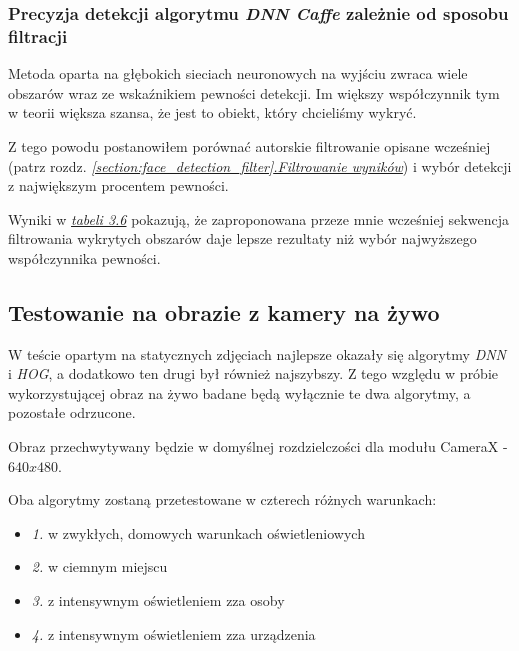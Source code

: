 \subsubsection{Precyzja detekcji algorytmu \textit{DNN Caffe} zależnie od sposobu filtracji}

Metoda oparta na głębokich sieciach neuronowych na wyjściu zwraca wiele obszarów wraz ze wskaźnikiem pewności detekcji. Im większy współczynnik tym w teorii większa szansa, że jest to obiekt, który chcieliśmy wykryć.
\par
Z tego powodu postanowiłem porównać autorskie filtrowanie opisane wcześniej (patrz rozdz. \hyperref[{section:face_detection_filter}]{\textit{\ref{section:face_detection_filter}.Filtrowanie wyników}}) i wybór detekcji z największym procentem pewności.
\par

\vspace{8mm}



Wyniki w \hyperref[{tab:face_filter_test}]{\textit{tabeli 3.6}} pokazują, że zaproponowana przeze mnie wcześniej sekwencja filtrowania wykrytych obszarów daje lepsze rezultaty niż wybór najwyższego współczynnika pewności.


\subsection{Testowanie na obrazie z kamery na żywo}

W teście opartym na statycznych zdjęciach najlepsze okazały się algorytmy \textit{DNN} i \textit{HOG}, a dodatkowo ten drugi był również najszybszy. Z tego względu w próbie wykorzystującej obraz na żywo badane będą wyłącznie te dwa algorytmy, a pozostałe odrzucone.
\par
Obraz przechwytywany będzie w domyślnej rozdzielczości dla modułu CameraX - $640x480$. \cite{camerax}
\par
Oba algorytmy zostaną przetestowane w czterech różnych warunkach:
\begin{itemize}
    \item \textit{1.} w zwykłych, domowych warunkach oświetleniowych
    \item \textit{2.} w ciemnym miejscu
    \item \textit{3.} z intensywnym oświetleniem zza osoby 
    \item \textit{4.} z intensywnym oświetleniem zza urządzenia
\end{itemize}

